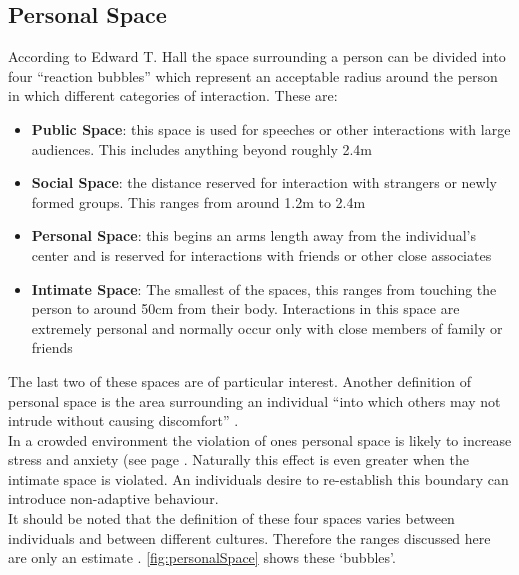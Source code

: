 \subsection{Personal Space}
\label{subsec:personalSpace}
According to Edward T. Hall \cite{HiddenDimension} the space surrounding a person can be divided into four ``reaction bubbles'' which represent an acceptable radius around the person in which different categories of interaction. These are:
\begin{itemize}
  \item{\textbf{Public Space}: this space is used for speeches or other interactions with large audiences. This includes anything beyond roughly 2.4m}
  \item{\textbf{Social Space}: the distance reserved for interaction with strangers or newly formed groups. This ranges from around 1.2m to 2.4m}
  \item{\textbf{Personal Space}: this begins an arms length away from the individual's center and is reserved for interactions with friends or other close associates}
  \item{\textbf{Intimate Space}: The smallest of the spaces, this ranges from touching the person to around 50cm from their body. Interactions in this space are extremely personal and normally occur only with close members of family or friends}
\end{itemize}
The last two of these spaces are of particular interest. Another definition of personal space is the area surrounding an individual ``into which others may not intrude without causing discomfort'' \cite[pg. 424]{HandbookOfPsychology5}.\\
In a crowded environment the violation of ones personal space is likely to increase stress and anxiety (see page \pageref{subsec:personalSpace}. Naturally this effect is even greater when the intimate space is violated. An individuals desire to re-establish this boundary can introduce non-adaptive behaviour.\\
It should be noted that the definition of these four spaces varies between individuals and between different cultures. Therefore the ranges discussed here are only an estimate \cite{ProxemicsWiki}. \ref{fig:personalSpace} shows these `bubbles'.

